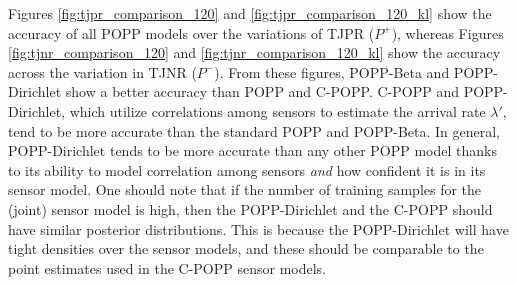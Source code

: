 Figures \ref{fig:tjpr_comparison_120} and \ref{fig:tjpr_comparison_120_kl} show the accuracy of all POPP models over the variations of TJPR ($P^+$), whereas Figures \ref{fig:tjnr_comparison_120} and \ref{fig:tjnr_comparison_120_kl} show the accuracy across the variation in TJNR ($P^-$). From these figures, POPP-Beta and POPP-Dirichlet show a better accuracy than POPP and C-POPP. C-POPP and POPP-Dirichlet, which utilize correlations among sensors to estimate the arrival rate $\lambda'$, tend to be more accurate than the standard POPP and POPP-Beta.
In general, POPP-Dirichlet tends to be more accurate than any other POPP model thanks to its ability to model correlation among sensors \emph{and} how confident it is in its sensor model.
One should note that if the number of training samples for the (joint) sensor model is high, then the POPP-Dirichlet and the C-POPP should have similar posterior distributions. This is because the POPP-Dirichlet will have tight densities over the sensor models, and these should be comparable to the point estimates used in the C-POPP  sensor models.
